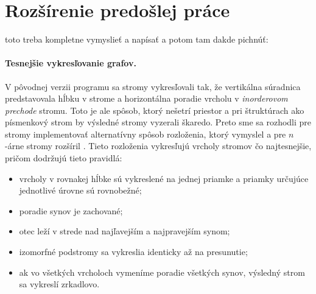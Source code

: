 \section{Rozšírenie predošlej práce}

toto treba kompletne vymyslieť a napísať a potom tam dakde pichnúť:

\paragraph{Tesnejšie vykresľovanie grafov.}
V pôvodnej verzii programu sa stromy vykresľovali tak, že vertikálna súradnica 
predstavovala hĺbku v strome a horizontálna poradie vrcholu v \emph{
inorderovom prechode} stromu. Toto je ale spôsob, ktorý 
nešetrí priestor a pri štruktúrach ako písmenkový strom by výsledné stromy 
vyzerali škaredo. Preto sme sa rozhodli pre stromy implementovať 
alternatívny spôsob rozloženia, ktorý vymyslel \citet{reingold} a pre $n$-árne 
stromy rozšíril \citet{walker}. Tieto rozloženia vykresľujú vrcholy stromov čo 
najtesnejšie, pričom dodržujú tieto pravidlá: 
\begin{itemize} 
\item vrcholy v rovnakej hĺbke sú vykreslené na jednej priamke a priamky 
určujúce jednotlivé úrovne sú rovnobežné; 
\item poradie synov je zachované; 
\item otec leží v strede nad najľavejším a najpravejším synom; 
\item izomorfné podstromy sa vykreslia identicky až na presunutie;
\item ak vo všetkých vrcholoch vymeníme poradie všetkých synov, výsledný strom 
sa vykreslí zrkadlovo.
\end{itemize}
